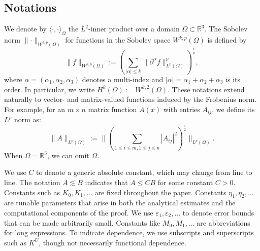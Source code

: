 \documentclass[11pt,a4paper]{article}
\numberwithin{equation}{section}
\newcommand{\assign}{:=}
\newcommand{\cdummy}{\cdot}
\newcommand{\nosymbol}{}
\begin{document}
\subsection{Notations}

We denote %
by $\langle \cdummy, \cdummy
\rangle_{\Omega}$ the $L^2$-inner product over a domain $\Omega \subset \mathbb{R}^3$. The Sobolev norm $\parallel \cdot
\parallel_{W^{k, p}
(\Omega)}$ for functions in the Sobolev space $W^{k, p}
(\Omega)$ is defined by
\[ \| \nosymbol f \|_{W^{k, p}
(\Omega)} \assign ( \sum_{| \alpha | \leqslant
   k} \| \partial^{\alpha} f \|_{L^p (\Omega)}^p )^{\frac{1}{p}}, \]
where $\alpha=(\alpha_1 , \alpha_2 ,
\alpha_3)$ denotes a multi-index and $| \alpha | = \alpha_1 + \alpha_2 +
\alpha_3$ is its order. 
In particular, we write $H^k (\Omega) \assign W^{k, 2} (\Omega)$. %
These notations extend naturally to vector- and matrix-valued functions induced by the Frobenius norm. For example, for an
$m \times n$ matrix function $A (x)$ with entries $A_{i j}$, we define its $L^p$ norm as: 
  \[ \| A \|_{L^p (\Omega)} \assign \| ( \sum_{
       1 \leqslant i \leqslant m, 1 \leqslant j \leqslant n
     } | A_{i j} |^2 )^{\frac{1}{2}} \|_{L^p (\Omega)}. \]
When $\Omega =\mathbb{R}^3$, we can omit $\Omega$.




We use $C$ to denote a generic absolute constant, which may change from line
to line. The notation $A \lesssim B$ indicates that $A \leqslant C B$ for some
constant $C > 0$. Constants such as $K_0, K_1, \ldots$ are fixed throughout
the paper. Constants $\eta_1, \eta_2, \ldots$ are tunable parameters that arise in both the analytical estimates and the computational components of the proof. We use $\varepsilon_1, \varepsilon_2, \ldots$ to denote error
bounds that can be made arbitrarily small. Constants like $M_0, M_1, \ldots$
are abbreviations for long expressions.
To indicate dependence, we use subscripts and superscripts such as $K^U$, though not necessarily functional
dependence.  
\end{document}

